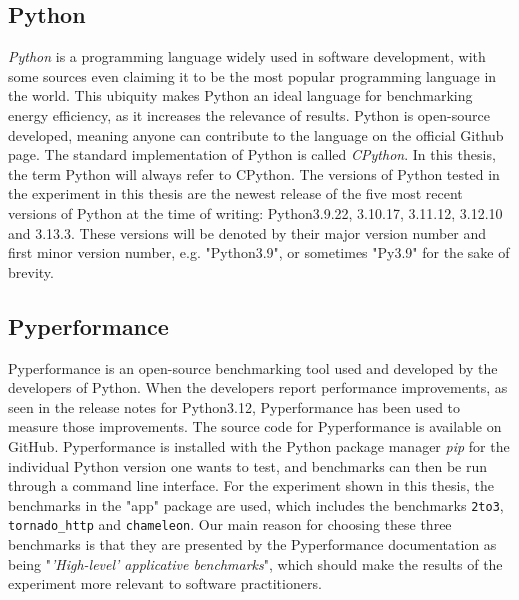 \subsection*{Python}
\textit{Python} is a programming language widely used in software development, with some sources even claiming it to be the most popular programming language in the world\cite{djurdjev2024popularity}\cite{tiobe}. This ubiquity makes Python an ideal language for benchmarking energy efficiency, as it increases the relevance of results. Python is open-source developed, meaning anyone can contribute to the language on the official Github page\cite{python_repo}. The standard implementation of Python is called \textit{CPython}. In this thesis, the term Python will always refer to CPython. The versions of Python tested in the experiment in this thesis are the newest release of the five most recent versions of Python at the time of writing: Python3.9.22, 3.10.17, 3.11.12, 3.12.10 and 3.13.3. These versions will be denoted by their major version number and first minor version number, e.g. "Python3.9", or sometimes "Py3.9" for the sake of brevity.

\subsection*{Pyperformance}
Pyperformance is an open-source benchmarking tool used and developed by the developers of Python. When the developers report performance improvements, as seen in the release notes for Python3.12\cite{py312}, Pyperformance has been used to measure those improvements. The source code for Pyperformance is available on GitHub\cite{pyperf_git}. Pyperformance is installed with the Python package manager \textit{pip} for the individual Python version one wants to test, and benchmarks can then be run through a command line interface. For the experiment shown in this thesis, the benchmarks in the "app" package are used, which includes the benchmarks \texttt{2to3}, \texttt{tornado\_http} and \texttt{chameleon}. Our main reason for choosing these three benchmarks is that they are presented by the Pyperformance documentation as being "\textit{'High-level' applicative benchmarks}"\cite{pyperf_docs}, which should make the results of the experiment more relevant to software practitioners.

